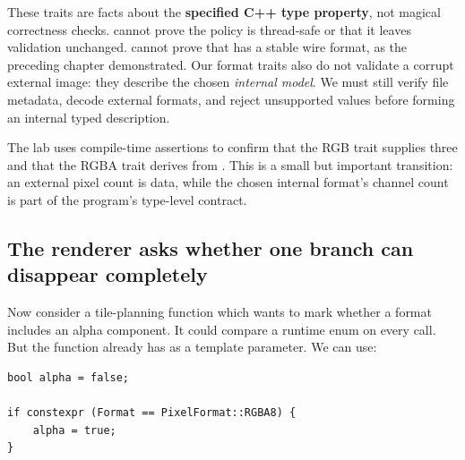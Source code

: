 These traits are facts about the \textbf{specified C++ type property}, not magical correctness checks.  cannot prove the policy is thread-safe or that it leaves validation unchanged.  cannot prove that  has a stable wire format, as the preceding chapter demonstrated. Our format traits also do not validate a corrupt external image: they describe the chosen \emph{internal model}. We must still verify file metadata, decode external formats, and reject unsupported values before forming an internal typed description.

The lab uses compile-time assertions to confirm that the RGB trait supplies three and that the RGBA trait derives from . This is a small but important transition: an external pixel count is data, while the chosen internal format's channel count is part of the program's type-level contract.

\subsection{The renderer asks whether one branch can disappear completely}\label{05-engine-i-ch005-the-renderer-asks-whether-one-branch-can-disappear-completely}

\hypertarget{05-engine-i-ch005-the-renderer-asks-whether-one-branch-can-disappear-completely}{}

Now consider a tile-planning function which wants to mark whether a format includes an alpha component. It could compare a runtime enum on every call. But the function already has  as a template parameter. We can use:

\begin{verbatim}
bool alpha = false;

if constexpr (Format == PixelFormat::RGBA8) {
    alpha = true;
}
\end{verbatim}

